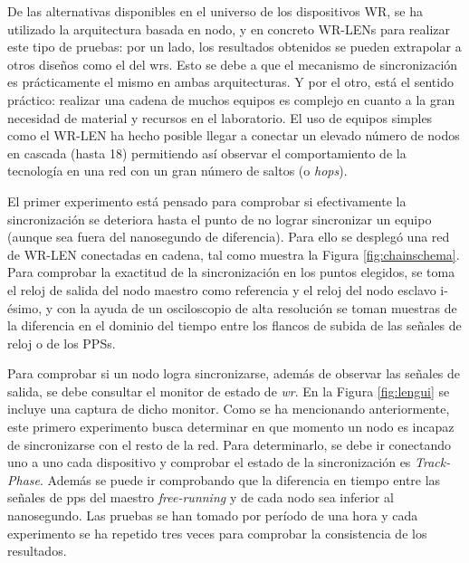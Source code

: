 De las alternativas disponibles en el universo de los dispositivos WR, se ha 
utilizado la arquitectura basada en nodo, y en concreto 
WR-LENs para realizar este tipo de pruebas: por un lado, los resultados 
obtenidos se pueden extrapolar a otros diseños como el del \gls{wrs}. Esto se 
debe a que el mecanismo de sincronización es prácticamente el mismo en ambas 
arquitecturas. Y por el otro, está el sentido práctico: realizar una cadena de 
muchos equipos es complejo en cuanto a la gran necesidad de material y recursos 
en el laboratorio. El uso de equipos simples como el WR-LEN ha hecho posible 
llegar a conectar un elevado número de nodos en cascada (hasta 18) permitiendo 
así observar el comportamiento de la tecnología en una red con un gran número 
de saltos (o \textit{hops}).

El primer experimento está pensado para comprobar si efectivamente la 
sincronización se deteriora hasta el punto de no lograr sincronizar un equipo 
(aunque sea fuera del nanosegundo de diferencia).
Para ello se desplegó una red de WR-LEN conectadas en cadena, tal como muestra 
la Figura \ref{fig:chainschema}. Para comprobar la exactitud de la 
sincronización en los puntos elegidos, se toma el reloj de salida del nodo 
maestro como referencia y el reloj del nodo esclavo i-ésimo, y con la ayuda de 
un osciloscopio de alta resolución se toman muestras de la diferencia en el 
dominio del tiempo entre los flancos de subida de las señales de reloj o de los 
PPSs.


Para comprobar si un nodo logra sincronizarse, además de observar las señales 
de salida, se debe consultar el monitor de estado de \textit{wr}. En la Figura 
\ref{fig:lengui} se incluye una captura de dicho monitor.  Como se ha mencionando anteriormente, 
este primero experimento busca 
determinar en que momento un nodo es incapaz de sincronizarse con el resto de 
la red. Para determinarlo, se debe ir conectando uno a uno cada dispositivo y 
comprobar el estado de la sincronización es \textit{Track-Phase}. 
Además se puede ir comprobando que la diferencia en tiempo entre las señales de 
\gls{pps} del maestro \textit{free-running} y de cada nodo sea inferior al 
nanosegundo. Las pruebas se han tomado por período de una hora y cada 
experimento se ha repetido tres veces para comprobar la consistencia de los 
resultados.

